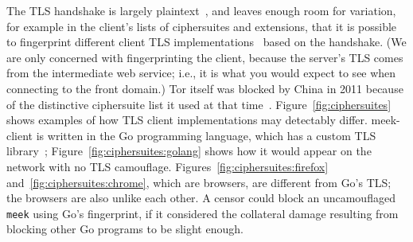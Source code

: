 \documentclass[conference]{IEEEtran}
\newcommand{\meekclient}{\mbox{meek-client}\xspace}
\newcommand{\meek}{\texttt{meek}\xspace}
\begin{document}
The TLS handshake is largely plaintext~\cite[Section~7.4]{rfc5246}, and leaves
enough room for variation, for example in
the client's lists of ciphersuites and extensions,
that it is possible to fingerprint different client TLS implementations~\cite{ssl-p0f}
based on the handshake.
(We are only concerned with fingerprinting the client,
because the server's TLS
comes from the intermediate web service;
i.e., it is what you would expect to see when connecting to the front domain.)
Tor itself was blocked by China in 2011
because of the distinctive ciphersuite list it used at that time~\cite{bug4744}.
Figure~\ref{fig:ciphersuites} shows examples of how TLS client
implementations may detectably differ.
\meekclient is written in the Go programming language,
which has a custom TLS library~\cite{golang-crypto/tls};
Figure~\ref{fig:ciphersuites:golang}
shows how it would appear on the network with no TLS camouflage.
Figures~\ref{fig:ciphersuites:firefox} and~\ref{fig:ciphersuites:chrome},
which are browsers, are different from Go's TLS; the browsers are also unlike each other.
A censor could block an uncamouflaged \meek using Go's fingerprint,
if it considered the collateral damage resulting from blocking other Go programs to be slight enough.
\end{document}
